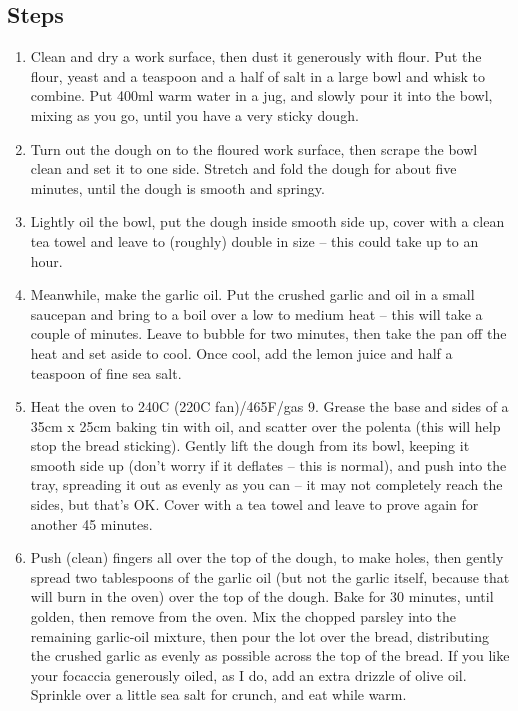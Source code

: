 \documentclass{book}
\begin{document}
\subsection*{Steps}
\begin{enumerate}
\item Clean and dry a work surface, then dust it generously with flour. Put the flour, yeast and a teaspoon and a half of salt in a large bowl and whisk to combine. Put 400ml warm water in a jug, and slowly pour it into the bowl, mixing as you go, until you have a very sticky dough.
\item Turn out the dough on to the floured work surface, then scrape the bowl clean and set it to one side. Stretch and fold the dough for about five minutes, until the dough is smooth and springy.
\item Lightly oil the bowl, put the dough inside smooth side up, cover with a clean tea towel and leave to (roughly) double in size – this could take up to an hour.
\item Meanwhile, make the garlic oil. Put the crushed garlic and oil in a small saucepan and bring to a boil over a low to medium heat – this will take a couple of minutes. Leave to bubble for two minutes, then take the pan off the heat and set aside to cool. Once cool, add the lemon juice and half a teaspoon of fine sea salt.
\item Heat the oven to 240C (220C fan)/465F/gas 9. Grease the base and sides of a 35cm x 25cm baking tin with oil, and scatter over the polenta (this will help stop the bread sticking). Gently lift the dough from its bowl, keeping it smooth side up (don’t worry if it deflates – this is normal), and push into the tray, spreading it out as evenly as you can – it may not completely reach the sides, but that’s OK. Cover with a tea towel and leave to prove again for another 45 minutes.
\item Push (clean) fingers all over the top of the dough, to make holes, then gently spread two tablespoons of the garlic oil (but not the garlic itself, because that will burn in the oven) over the top of the dough. Bake for 30 minutes, until golden, then remove from the oven. Mix the chopped parsley into the remaining garlic-oil mixture, then pour the lot over the bread, distributing the crushed garlic as evenly as possible across the top of the bread. If you like your focaccia generously oiled, as I do, add an extra drizzle of olive oil. Sprinkle over a little sea salt for crunch, and eat while warm.
\end{enumerate}
\newpage
\end{document}
